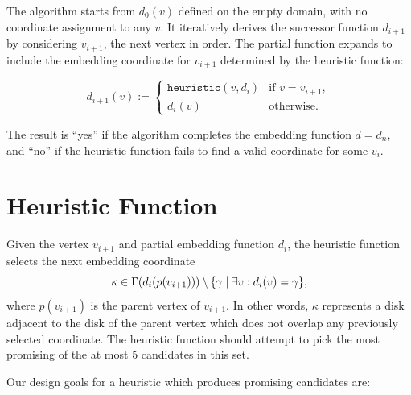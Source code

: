 The algorithm starts from $d_0(v)$ defined on the empty domain, with no coordinate assignment to any $v$. It iteratively derives the successor function $d_{i+1}$ by considering $v_{i+1}$, the next vertex in order.
The partial function expands to include the embedding coordinate for $v_{i+1}$ determined by the heuristic function:

\begin{equation*}
    d_{i+1}(v) := \begin{cases} \texttt{heuristic}(v, d_i) & \text{if } v = v_{i+1},\\ d_i(v)& \text{otherwise}. \end{cases}
\end{equation*}

The result is ``yes'' if the algorithm completes the embedding function $d = d_n$, and ``no'' if the heuristic function fails to find a valid coordinate for some $v_i$.

\section{Heuristic Function}

Given the vertex $v_{i+1}$ and partial embedding function $d_i$, the heuristic function selects the next embedding coordinate $$\kappa \in \Gamma(d_i(p(v_{i+1}))) \setminus \{ \gamma \mid \exists v: d_i(v) = \gamma \},$$ where $p(v_{i+1})$ is the parent vertex of $v_{i+1}$. In other words, $\kappa$ represents a disk adjacent to the disk of the parent vertex which does not overlap any previously selected coordinate. The heuristic function should attempt to pick the most promising of the at most 5 candidates in this set.

Our design goals for a heuristic which produces promising candidates are:

